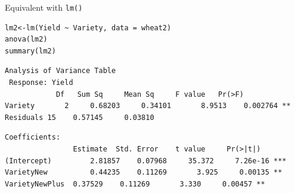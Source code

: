 \documentclass[10pt]{beamer}
\makeatletter
\newenvironment{kframe}{%
 \def\at@end@of@kframe{}%
 \ifinner\ifhmode%
  \def\at@end@of@kframe{\end{minipage}}%
  \begin{minipage}{\columnwidth}%
 \fi\fi%
 \def\FrameCommand##1{\hskip\@totalleftmargin \hskip-\fboxsep
 \colorbox{shadecolor}{##1}\hskip-\fboxsep
     \hskip-\linewidth \hskip-\@totalleftmargin \hskip\columnwidth}%
 \MakeFramed {\advance\hsize-\width
   \@totalleftmargin\z@ \linewidth\hsize
   \@setminipage}}%
 {\par\unskip\endMakeFramed%
 \at@end@of@kframe}
\newenvironment{knitrout}{}{} %
\makeatother
\begin{document}
\begin{frame}[fragile]{Equivalent with \texttt{lm()}}
    \begin{knitrout}
\color{fgcolor}\begin{kframe}
\footnotesize
\begin{verbatim}
lm2<-lm(Yield ~ Variety, data = wheat2) 
anova(lm2)
summary(lm2)
\end{verbatim}
\end{kframe}
\end{knitrout}
 
   \begin{knitrout}
\color{fgcolor}\begin{kframe}
\footnotesize
\begin{verbatim}
Analysis of Variance Table
 Response: Yield
          	Df 	 Sum Sq 	Mean Sq     F value   Pr(>F)   
Variety       2 	0.68203   	0.34101       8.9513    0.002764 **
Residuals 15 	0.57145  	0.03810 
\end{verbatim}
\end{kframe}
\end{knitrout}

 
   \begin{knitrout}
\color{fgcolor}\begin{kframe}
\footnotesize
\begin{verbatim}
Coefficients:
               	Estimate  Std. Error    t value     Pr(>|t|)    
(Intercept)     	2.81857    0.07968     35.372     7.26e-16 ***
VarietyNew      	0.44235    0.11269       3.925     0.00135 ** 
VarietyNewPlus 	0.37529    0.11269       3.330     0.00457 ** 
\end{verbatim}
\end{kframe}
\end{knitrout}

\end{frame}
\end{document}
